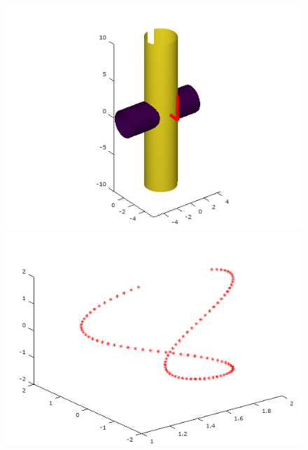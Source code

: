 \documentclass[12pt]{article}
\begin{document}
\begin{minipage}{\textwidth}
\begin{figure}[H]
			\includegraphics[scale=0.47]{primer7_3}
			\includegraphics[scale=0.47]{primer7_4} 
		\end{figure}    
	\end{minipage}
	
\end{document}
